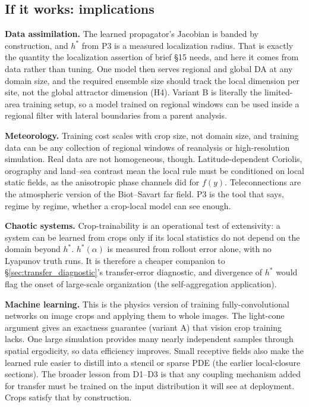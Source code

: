 \documentclass[11pt]{article}
\begin{document}
\subsection{If it works: implications}

\textbf{Data assimilation.} The learned propagator's Jacobian is banded by
construction, and $h^*$ from P3 is a measured localization radius. That
is exactly the quantity the localization assertion of brief \S15 needs,
and here it comes from data rather than tuning. One model then serves
regional and global DA at any domain size, and the required ensemble size
should track the local dimension per site, not the global attractor
dimension (H4). Variant B is literally the limited-area training setup,
so a model trained on regional windows can be used inside a regional
filter with lateral boundaries from a parent analysis.

\textbf{Meteorology.} Training cost scales with crop size, not domain
size, and training data can be any collection of regional windows of
reanalysis or high-resolution simulation. Real data are not homogeneous,
though. Latitude-dependent Coriolis, orography and land--sea contrast
mean the local rule must be conditioned on local static fields, as the
anisotropic phase channels did for $f(y)$. Teleconnections are the
atmospheric version of the Biot--Savart far field. P3 is the tool that
says, regime by regime, whether a crop-local model can see enough.

\textbf{Chaotic systems.} Crop-trainability is an operational test of
extensivity: a system can be learned from crops only if its local
statistics do not depend on the domain beyond $h^*$. $h^*(\alpha)$ is
measured from rollout error alone, with no Lyapunov truth runs. It is
therefore a cheaper companion to \S\ref{sec:transfer_diagnostic}'s
transfer-error diagnostic, and divergence of $h^*$ would flag the onset of
large-scale organization (the self-aggregation application).

\textbf{Machine learning.} This is the physics version of training
fully-convolutional networks on image crops and applying them to whole
images. The light-cone argument gives an exactness guarantee (variant A)
that vision crop training lacks. One large simulation provides many
nearly independent samples through spatial ergodicity, so data efficiency
improves. Small receptive fields also make the learned rule easier to
distill into a stencil or sparse PDE (the earlier local-closure
sections). The broader lesson from D1--D3 is that any coupling mechanism
added for transfer must be trained on the input distribution it will see
at deployment. Crops satisfy that by construction.
\end{document}
